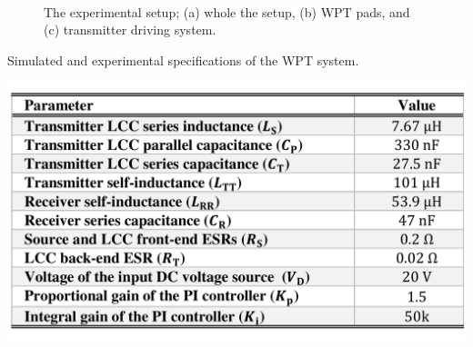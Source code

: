 \documentclass[journal,a4paper,10pt,twoside]{IEEEtran} %
\begin{document}
\begin{figure}
\begin{center}
{	                }\\
	                \vspace{-3mm}
	    \end{center}
	    \vspace{-3mm}
	    \caption{The experimental setup; (a) whole the setup, (b) WPT pads, and (c) transmitter driving system.}
	    \label{FIG20}
	    \vspace{-3mm}
	\end{figure}
	 
	 \begin{table} [b]
	    \begin{center}
	    \caption{Simulated and experimental specifications of the WPT system.}
	    \label{TBL1}
	            \includegraphics[clip, trim=0mm 10mm 0mm 10mm, width=1\columnwidth]{FIGS/TBL1.pdf}
	    \end{center}
	    \vspace{-3mm}
	\end{table}
	 
\end{document}

